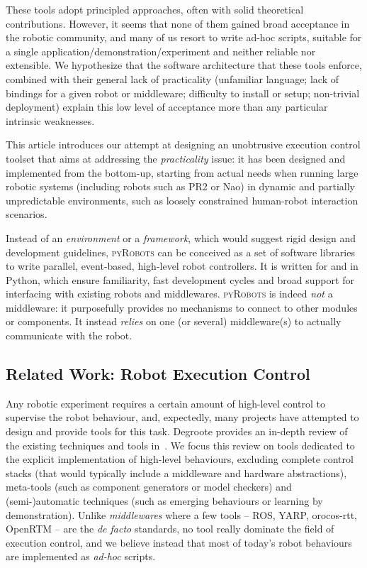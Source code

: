 \documentclass[a4paper, 10pt, conference]{ieeeconf}      %
\newcommand{\pyRobots}{\textsc{pyRobots}}
\begin{document}
These tools adopt principled approaches, often with solid theoretical
contributions. However, it seems that none of them gained broad acceptance in
the robotic community, and many of us resort to write ad-hoc scripts, suitable
for a single application/demonstration/experiment and neither reliable nor
extensible. We hypothesize that the software architecture that these tools
enforce, combined with their general lack of practicality (unfamiliar language;
lack of bindings for a given robot or middleware; difficulty to install or
setup; non-trivial deployment) explain this low level of acceptance more than
any particular intrinsic weaknesses.

This article introduces our attempt at designing an unobtrusive execution
control toolset that aims at addressing the \emph{practicality} issue: it has
been designed and implemented from the bottom-up, starting from actual needs
when running large robotic systems (including robots such as PR2 or Nao) in
dynamic and partially unpredictable environments, such as loosely constrained
human-robot interaction scenarios.

Instead of an \emph{environment} or a \emph{framework}, which would suggest
rigid design and development guidelines, \pyRobots{} can be conceived as a set
of software libraries to write parallel, event-based, high-level robot
controllers.  It is written for and in Python, which ensure familiarity, fast
development cycles and broad support for interfacing with existing robots and
middlewares. \pyRobots{} is indeed \emph{not} a middleware: it purposefully
provides no mechanisms to connect to other modules or components. It instead
\emph{relies} on one (or several) middleware(s) to actually communicate with the
robot.

\subsection{Related Work: Robot Execution Control}

Any robotic experiment requires a certain amount of high-level control to
supervise the robot behaviour, and, expectedly, many projects have attempted to
design and provide tools for this task. Degroote provides an in-depth review of
the existing techniques and tools in~\cite{degroote2012architecture}. We focus
this review on tools dedicated to the explicit implementation of high-level
behaviours, excluding complete control stacks (that would typically include a
middleware and hardware abstractions), meta-tools (such as component generators
or model checkers) and (semi-)automatic techniques (such as emerging behaviours
or learning by demonstration). Unlike \emph{middlewares} where a few tools --
ROS, YARP, {\sc orocos}-rtt, OpenRTM -- are the \emph{de facto} standards, no tool really
dominate the field of execution control, and we believe instead that most of
today's robot behaviours are implemented as \emph{ad-hoc} scripts.
\end{document}
